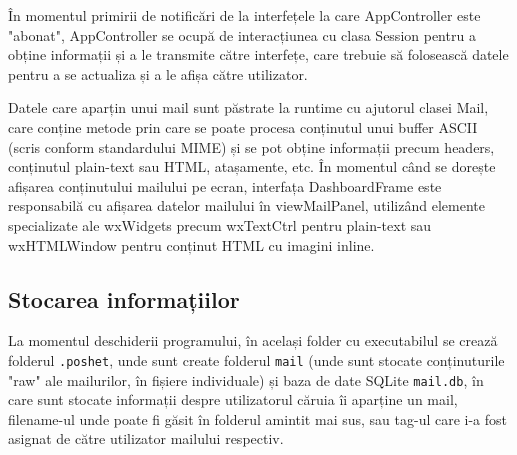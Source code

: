 \documentclass[runningheads]{llncs}
\begin{document}
În momentul primirii de notificări de la interfețele la care AppController este "abonat", AppController se ocupă de interacțiunea cu clasa Session pentru a obține informații și a le transmite către interfețe, care trebuie să folosească datele pentru a se actualiza și a le afișa către utilizator.

Datele care aparțin unui mail sunt păstrate la runtime cu ajutorul clasei Mail, care conține metode prin care se poate procesa conținutul unui buffer ASCII (scris conform standardului MIME) și se pot obține informații precum headers, conținutul plain-text sau HTML, atașamente, etc. În momentul când se dorește afișarea conținutului mailului pe ecran, interfața DashboardFrame este responsabilă cu afișarea datelor mailului în viewMailPanel, utilizând elemente specializate ale wxWidgets precum wxTextCtrl pentru plain-text sau wxHTMLWindow pentru conținut HTML cu imagini inline.


\subsection{Stocarea informațiilor}

La momentul deschiderii programului, în același folder cu executabilul se crează folderul \texttt{.poshet}, unde sunt create folderul \texttt{mail} (unde sunt stocate conținuturile "raw" ale mailurilor, în fișiere individuale) și baza de date SQLite \texttt{mail.db}, în care sunt stocate informații despre utilizatorul căruia îi aparține un mail,  filename-ul unde poate fi găsit în folderul amintit mai sus, sau tag-ul care i-a fost asignat de către utilizator mailului respectiv.
\end{document}
